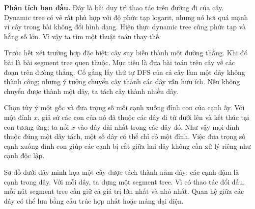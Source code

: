 \documentclass[11pt]{article}
\begin{document}
\textbf{Phân tích ban đầu.} Đây là bài duy trì thao tác trên đường đi của
cây. Dynamic tree có vẻ rất phù hợp với độ phức tạp logarit, nhưng nó hơi
quá mạnh vì cây trong bài không đổi hình dạng. Hiện thực dynamic tree cũng
phức tạp và hằng số lớn. Vì vậy ta tìm một thuật toán thay thế.

Trước hết xét trường hợp đặc biệt: cây suy biến thành một đường thẳng. Khi
đó bài là bài segment tree quen thuộc. Mục tiêu là đưa bài toán trên cây về
các đoạn trên đường thẳng. Cố gắng lấy thứ tự DFS của cả cây làm một dãy
không thành công; nhưng ý tưởng chuyển cây thành các dây vẫn hữu ích. Nếu
không chuyển được thành một dây, ta tách cây thành nhiều dây.

Chọn tùy ý một gốc và đưa trọng số mỗi cạnh xuống đỉnh con của cạnh ấy. Với
một đỉnh \(x\), giả sử các con của nó đã thuộc các dây đi từ dưới lên và kết
thúc tại con tương ứng; ta nối \(x\) vào dây dài nhất trong các dây đó. Như
vậy mọi đỉnh thuộc đúng một dây tách, một số dây có thể chỉ có một đỉnh. Việc
đưa trọng số cạnh xuống đỉnh con giúp các cạnh bị cắt giữa hai dây không cần
xử lý riêng như cạnh độc lập.

Sơ đồ dưới đây minh họa một cây được tách thành năm dây; các cạnh đậm là cạnh
trong dây. Với mỗi dây, ta dựng một segment tree. Vì có thao tác đổi dấu, mỗi
nút segment tree cần giữ cả giá trị lớn nhất và nhỏ nhất. Quan hệ giữa các
dây có thể lưu bằng cấu trúc hợp nhất hoặc mảng đại diện.

\begin{center}
\end{center}
\end{document}
